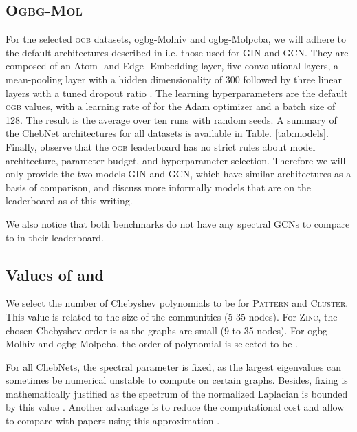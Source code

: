 \documentclass[letterpaper]{article} \usepackage{aaai21}  \usepackage{times}  \usepackage{helvet} \usepackage{courier}  \usepackage[hyphens]{url}  \usepackage{graphicx} \usepackage{natbib}  \usepackage{caption} \frenchspacing  \setlength{\pdfpagewidth}{8.5in}  \setlength{\pdfpageheight}{11in}
\begin{document}
\subsection{\textsc{Ogbg-Mol}}
For the selected \textsc{ogb} datasets, ogbg-Molhiv and ogbg-Molpcba, we will adhere to the default architectures described in \cite{hu_open_2020} i.e. those used for GIN and GCN.
They are composed of an Atom- and Edge- Embedding layer, five convolutional layers, a mean-pooling layer with a hidden dimensionality of 300 followed by three linear layers with a tuned dropout ratio .
The learning hyperparameters are the default \textsc{ogb} values, with a learning rate of  for the Adam optimizer and a batch size of 128. The result is the average over ten runs with random seeds.
A summary of the ChebNet architectures for all datasets is available in Table. \ref{tab:models}.
Finally, observe that the \textsc{ogb} leaderboard has no strict rules about model architecture, parameter budget, and hyperparameter selection.
Therefore we will only provide the two models GIN and GCN, which have similar architectures as a basis of comparison, and discuss more informally models that are on the leaderboard as of this writing.

We also notice that both benchmarks do not have any spectral GCNs to compare to in their leaderboard.


\subsection{Values of  and }
We select the number of Chebyshev polynomials to be  for \textsc{Pattern} and \textsc{Cluster}. This value is related to the size of the communities (5-35 nodes). For \textsc{Zinc}, the chosen Chebyshev order is  as the graphs are small (9 to 35 nodes). For ogbg-Molhiv and ogbg-Molpcba, the order of polynomial is selected to be .

For all ChebNets, the spectral parameter  is fixed, as the largest eigenvalues can sometimes be numerical unstable to compute on certain graphs. Besides, fixing  is mathematically justified as the spectrum of the normalized Laplacian is bounded by this value \cite{chung1997spectral}. Another advantage is to reduce the computational cost and allow to compare with papers using this approximation \cite{knyazev_image_2019, knyazev_spectral_2018}.
\end{document}
